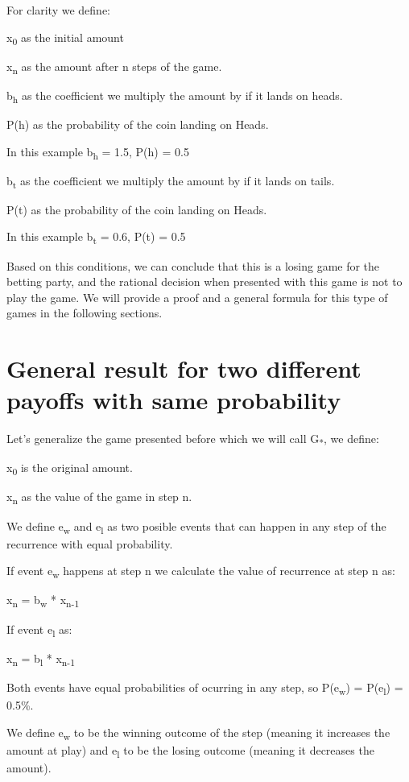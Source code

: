 \documentclass[12pt,reqno]{amsart}
\begin{document}
For clarity we define:

x\textsubscript{0} as the initial amount

x\textsubscript{n} as the amount after n steps of the game.

b\textsubscript{h} as the coefficient we multiply the amount by if it lands on heads.

P(h) as the probability of the coin landing on Heads. 

In this example b\textsubscript{h} = 1.5, P(h) = 0.5

b\textsubscript{t} as the coefficient we multiply the amount by if it lands on tails.

P(t) as the probability of the coin landing on Heads. 

In this example b\textsubscript{t} = 0.6, P(t) = 0.5

Based on this conditions, we can conclude that this is a losing game for the betting party, and the rational decision when presented with this game is not to play the game. We will provide a proof and a general formula for this type of games in the following sections.


\section{General result for two different payoffs with same probability}

Let's generalize the game presented before which we will call G\textsubscript{*}, we define:

x\textsubscript{0} is the original amount.

x\textsubscript{n} as the value of the game in step n.

We define e\textsubscript{w} and e\textsubscript{l} as two posible events that can happen in any step of the recurrence with equal probability.

If event e\textsubscript{w} happens at step n we calculate the value of  recurrence at step n as:

x\textsubscript{n} = b\textsubscript{w} * x\textsubscript{n-1}

If event e\textsubscript{l} as: 

x\textsubscript{n} = b\textsubscript{l} * x\textsubscript{n-1}

Both events have equal probabilities of ocurring in any step, so P(e\textsubscript{w}) = P(e\textsubscript{l}) = 0.5\%. 

We define e\textsubscript{w} to be the winning outcome of the step (meaning it increases the amount at play) and e\textsubscript{l} to be the losing outcome (meaning it decreases the amount). 
\end{document}
